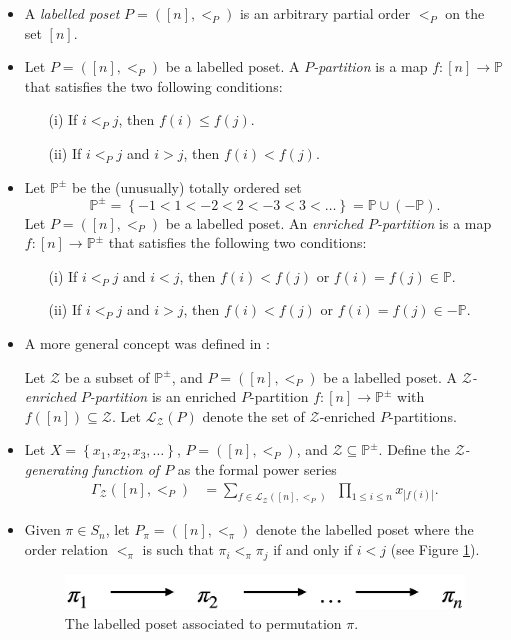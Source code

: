 \documentclass[numbers=enddot,12pt,final,onecolumn,notitlepage]{scrartcl}%
\newcommand{\PP}{\mathbb{P}} %
\newcommand{\set}[1]{\left\{ #1 \right\}}
\newcommand{\tup}[1]{\left( #1 \right)}
\newcommand{\defn}[1]{{\color{darkred}\emph{#1}}}
\newcommand{\0}{\phantom{c}}
\let\sumnonlimits\sum
\let\prodnonlimits\prod
\renewcommand{\sum}{\sumnonlimits\limits}
\renewcommand{\prod}{\prodnonlimits\limits}
\begin{document}
\begin{itemize}
\item A \defn{labelled poset} $P=([n],<_P)$ is an arbitrary partial order $<_P$ on the set $[n]$. 
\item Let $P = ([n],<_P)$ be a labelled poset.
A \defn{$P$-partition} is a map $f: [n]\longrightarrow \PP$ that satisfies the two following conditions:
\begin{itemize}
\item[(i)] If $i <_P j$, then $f(i) \leq f(j)$.
\item[(ii)] If $i <_P j$ and $i > j$, then $f(i) < f(j)$.
\end{itemize}
\item Let \defn{$\PP^{\pm}$} be the (unusually) totally ordered set
\[
\PP^{\pm} = \set{-1<1<-2<2<-3<3<\dots}
= \PP \cup \tup{-\PP}.
\]
Let $P = ([n],<_P)$ be a labelled poset.
An \defn{enriched $P$-partition} is a map $f: [n]\longrightarrow \PP^{\pm} $ that satisfies the following two conditions:
\begin{itemize}
\item[(i)] If $i <_P j$ and $i < j$, then $f(i) < f(j)$ or $f(i) = f(j) \in \PP$.
\item[(ii)] If $i <_P j$ and $i>j$, then $f(i) < f(j)$ or $f(i) = f(j) \in -\PP$.
\end{itemize} 
\item A more general concept was defined in \cite{Gri18}:

Let $\mathcal{Z}$ be a subset of %
$\PP^{\pm}$, and $P=([n],<_P)$ be a labelled poset.
A \defn{$\mathcal{Z}$-enriched $P$-partition} is
an enriched $P$-partition $f : [n] \longrightarrow \PP^{\pm} $ with $f([n]) \subseteq \mathcal{Z}$.
Let \defn{$\mathcal{L}_\mathcal{Z}(P)$} denote the set of $\mathcal{Z}$-enriched $P$-partitions.

\item Let $X = \left\{x_1,x_2,x_3,\ldots\right\}$, $P =([n],<_P)$, and $\mathcal{Z} \subseteq \PP^{\pm}$. Define the  \defn{$\mathcal{Z}$-generating function of $P$} as the formal power series
\begin{align}
\label{eq : GammaTrad}
\Gamma_{\mathcal{Z}}([n], <_P) &= \sum_{f \in \mathcal{L}_\mathcal{Z}([n],<_P)}\ \ \prod_{1\leq i \leq n}x_{|f(i)|} .
\end{align}
\item Given $\pi \in S_n$, let $P_\pi = ([n],<_\pi)$ denote the labelled poset where the order relation $<_\pi$ is such that $\pi_i <_\pi \pi_j$ if and only if $i < j$ (see Figure \ref{fig : ppart}).
\begin{figure}[htbp]
\begin{center}
 \includegraphics[scale=0.20]{PPart}\caption{The labelled poset associated to permutation $\pi$.}
 \label{fig : ppart}
 \end{center}
 \end{figure}


\end{itemize}
\end{document}
